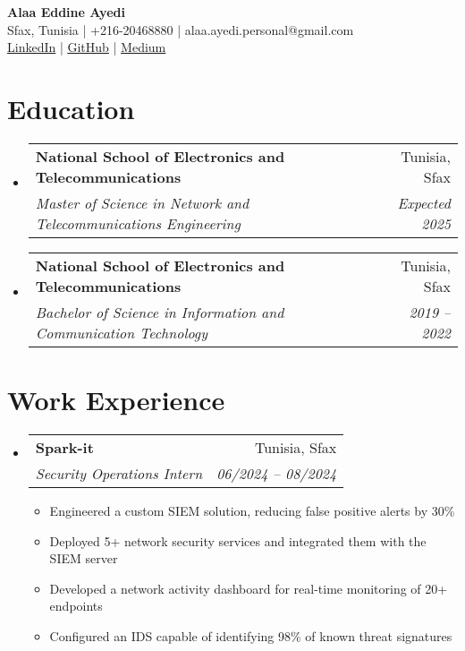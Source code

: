 \documentclass[a4paper,10pt]{article}
\makeatletter
\newcommand{\resumeItem}[1]{
  \item\small{#1}
}
\newcommand{\resumeSubheading}[4]{
  \vspace{-2pt}\item
    \begin{tabular*}{0.97\textwidth}[t]{l@{\extracolsep{\fill}}r}
      \textbf{#1} & #2 \\
      \textit{#3} & \textit{#4} \\
    \end{tabular*}\vspace{-7pt}
}
\newcommand{\resumeSubHeadingListStart}{\begin{itemize}[leftmargin=*,label={}]}
\newcommand{\resumeSubHeadingListEnd}{\end{itemize}}
\newcommand{\resumeItemListStart}{\begin{itemize}}
\newcommand{\resumeItemListEnd}{\end{itemize}\vspace{-5pt}}
\makeatother
\begin{document}
\begin{center}
    {\Huge \textbf{Alaa Eddine Ayedi}} \\
    \small
    Sfax, Tunisia | +216-20468880 | alaa.ayedi.personal@gmail.com \\
    \href{https://www.linkedin.com/in/alaaeddineayedi/}{LinkedIn} |
    \href{https://github.com/nattycoder}{GitHub} |
    \href{https://medium.com/@alaayedi090}{Medium}
\end{center}

\section{Education}
\resumeSubHeadingListStart
  \resumeSubheading
    {National School of Electronics and Telecommunications}{Tunisia, Sfax}
    {Master of Science in Network and Telecommunications Engineering}{Expected 2025}
  \resumeSubheading
    {National School of Electronics and Telecommunications}{Tunisia, Sfax}
    {Bachelor of Science in Information and Communication Technology}{2019 -- 2022}
\resumeSubHeadingListEnd

\section{Work Experience}
\resumeSubHeadingListStart
  \resumeSubheading
    {Spark-it}{Tunisia, Sfax}
    {Security Operations Intern}{06/2024 -- 08/2024}
    \resumeItemListStart
        \resumeItem{Engineered a custom SIEM solution, reducing false positive alerts by 30\%}
        \resumeItem{Deployed 5+ network security services and integrated them with the SIEM server}
        \resumeItem{Developed a network activity dashboard for real-time monitoring of 20+ endpoints}
        \resumeItem{Configured an IDS capable of identifying 98\% of known threat signatures}
    \resumeItemListEnd
\resumeSubHeadingListEnd
\end{document}

